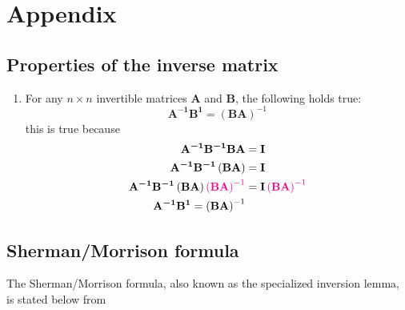 \documentclass[12pt]{article}
\newcommand{\mat}[1]{\boldsymbol{\mathbf{#1}}}
\newcommand{\parentheses}[1]{\left(#1\right)}
\newcommand{\magenta}[1]{\color{magenta}#1\color{black}}
\begin{document}
\section{Appendix}
\subsection{Properties of the inverse matrix}
\begin{enumerate}
    \item For any $n\times n$ invertible matrices $\mat{A}$ and $\mat{B}$, the following holds true:
    \begin{equation}
        \mat{A^{-1}} \mat{B^{1}} = \left(\mat{B A}\right)^{-1}
    \end{equation}
    this is true because
    \begin{equation*}
    \begin{aligned}
        \mat{A^{-1}}\mat{B^{-1}}\mat{B A} &= \mat{I}\\
        \mat{A^{-1}}\mat{B^{-1}}\parentheses{\mat{B A}} &= \mat{I}\\
        \mat{A^{-1}}\mat{B^{-1}}\parentheses{\mat{B A}}\magenta{\parentheses{\mat{B A}}^{-1}} &= \mat{I}\magenta{\parentheses{\mat{B A}}^{-1}} \\
        \mat{A^{-1}} \mat{B^{1}} = \left(\mat{B A}\right)^{-1}
    \end{aligned}
    \end{equation*}
\end{enumerate}



\subsection{Sherman/Morrison formula}
The Sherman/Morrison formula, also known as the specialized inversion lemma, is stated below from \cite[p.~50]{bongard2006probabilistic}
\end{document}
